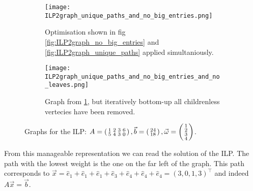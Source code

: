 \begin{figure}
    \centering
    \begin{subfigure}[b]{0.45\textwidth}
        \texttt{[image: ILP2graph\_unique\_paths\_and\_no\_big\_entries.png]}
        \caption{Optimisation shown in fig \ref{fig:ILP2graph_no_big_entries} and \ref{fig:ILP2graph_unique_paths} applied simultaniously.}
        \label{fig:ILP2graph_unique_paths_and_no_big_entries}
    \end{subfigure}
    \hfill
    \begin{subfigure}[b]{0.45\textwidth}
        \centering
        \texttt{[image: ILP2graph\_unique\_paths\_and\_no\_big\_entries\_and\_no\_leaves.png]}
        \caption{Graph from \ref{fig:ILP2graph_unique_paths_and_no_big_entries}, but iteratively bottom-up all childrenless vertecies have been removed.}
        \label{fig:ILP2graph_unique_paths_and_no_big_entries_and_no_leaves}
    \end{subfigure}
    \caption{Graphs for the ILP: $A = \left(\begin{smallmatrix}1&2&3&6\\5&4&3&0\end{smallmatrix}\right), \vec b = \left(\begin{smallmatrix}24\\18\end{smallmatrix}\right), \vec \omega = \left(\begin{smallmatrix}1\\2\\3\\4\end{smallmatrix}\right)$.}
\end{figure}


From this manageable representation we can read the solution of the ILP. The path with the lowest weight is the one on the far left of the graph. This path corresponds to $\vec x = \hat e_1 + \hat e_1 + \hat e_1 + \hat e_3 + \hat e_4 + \hat e_4 + \hat e_4 = (3, 0, 1, 3)^\top$ and indeed $A\vec x = \vec b$. 

